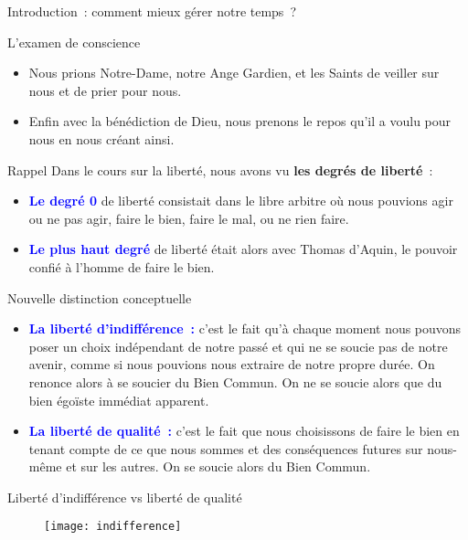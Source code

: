 \documentclass[11pt,xcolor=dvipsname,ignorenonframetext,handout]{beamer}
\begin{document}
\begin{frame}{Introduction~: comment mieux gérer notre temps~?}
\begin{frame}{L'examen de conscience}
\begin{itemize}
        \item Nous prions Notre-Dame, notre Ange Gardien, et les Saints de veiller sur nous et de prier pour nous.
        \item Enfin avec la bénédiction de Dieu, nous prenons le repos qu'il a voulu pour nous en nous créant ainsi.
\end{itemize}
\end{frame}
\begin{frame}{Rappel}
    \rightskip=0pt\leftskip=0pt
    Dans le cours sur la liberté, nous avons vu \textbf{les degrés de liberté}~:
    \begin{itemize}
        \rightskip=0pt\leftskip=0pt
        \item \textcolor{blue}{\textbf{Le degré 0}} de liberté consistait dans le libre arbitre où nous pouvions agir ou ne pas agir, faire le bien, faire le mal, ou ne rien faire.
        \item \textcolor{blue}{\textbf{Le plus haut degré}} de liberté était alors avec Thomas d'Aquin, le pouvoir confié à l'homme de faire le bien.
    \end{itemize}
\end{frame}
\begin{frame}{Nouvelle distinction conceptuelle}
    \begin{itemize}
        \rightskip=0pt\leftskip=0pt
        \item \textcolor{blue}{\textbf{La liberté d'indifférence~:}} c'est le fait qu'à chaque moment nous pouvons poser un choix indépendant de notre passé et qui ne se soucie pas de notre avenir, comme si nous pouvions nous extraire de notre propre durée. On renonce alors à se soucier du Bien Commun. On ne se soucie alors que du bien égoïste immédiat apparent.
        \item \textcolor{blue}{\textbf{La liberté de qualité~:}} c'est le fait que nous choisissons de faire le bien en tenant compte de ce que nous sommes et des conséquences futures sur nous-même et sur les autres. On se soucie alors du Bien Commun.
    \end{itemize}
\end{frame}
\begin{frame}{Liberté d'indifférence vs liberté de qualité}
    {
        \begin{figure}
          \centering
          \texttt{[image: indifference]}
        \end{figure}
}
\end{frame}
\end{frame}
\end{document}
